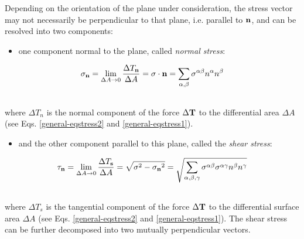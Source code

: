 \documentclass[letterpaper,10pt,english]{sphinxmanual}
\begin{document}
Depending on the orientation of the plane under consideration, the stress vector may not necessarily be perpendicular to that plane, i.e. parallel to ${\bf n}$, and can be resolved into two components:
\begin{itemize}
\item {} 
one component normal to the plane, called \emph{normal stress}:

\end{itemize}
\label{general:equation-eqstress10}\begin{gather}
\begin{split}\sigma_{\bf n} = \lim_{\Delta A \to 0}\frac{\Delta T_{\bf n}}{\Delta A} = {\bf \sigma} \cdot {\bf n} = \sum_{\alpha,\beta}{\sigma^{\alpha\beta}n^{\alpha}n^{\beta}}\end{split}\label{general-eqstress10}\\\begin{split}\end{split}\notag
\end{gather}
where $\Delta T_n$ is the normal component of the force $\Delta {\bf T}$ to the differential area $\Delta A$ (see Eqs. \eqref{general-eqstress2} and \eqref{general-eqstress1}).
\begin{itemize}
\item {} 
and the other component parallel to this plane, called the \emph{shear stress}:

\end{itemize}
\label{general:equation-eqstress11}\begin{gather}
\begin{split}\tau_{\bf n} = \lim_{\Delta A \to 0}\frac{\Delta T_{\bf s}}{\Delta A}  = \sqrt{{\bf \sigma}^{2} - {\bf \sigma_{n}}^2} = \sqrt{\sum_{\alpha, \beta, \gamma}{\sigma^{\alpha\beta} \sigma^{\alpha\gamma} n^{\beta} n^{\gamma}}}\end{split}\label{general-eqstress11}\\\begin{split}\end{split}\notag
\end{gather}
where $\Delta T_s$ is the tangential component of the force $\Delta {\bf T}$ to the differential surface area $\Delta A$ (see Eqs. \eqref{general-eqstress2} and \eqref{general-eqstress1}). The shear stress can be further decomposed into two mutually perpendicular vectors.
\end{document}
